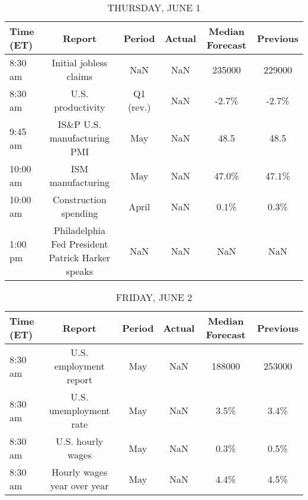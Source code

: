 \documentclass{article}%
\begin{document}
%


\begin{table}[htbp]%
\caption{THURSDAY, JUNE 1}%
\centering%
\begin{adjustbox}{width=1\textwidth}%
\begin{tabular}{lccccc}
\toprule
Time (ET) &                                           Report &    Period & Actual & Median Forecast & Previous \\
\midrule
  8:30 am &                           Initial jobless claims &       NaN &    NaN &          235000 &   229000 \\
  8:30 am &                                U.S. productivity & Q1 (rev.) &    NaN &           -2.7\% &    -2.7\% \\
  9:45 am &                      IS\&P U.S. manufacturing PMI &       May &    NaN &            48.5 &     48.5 \\
 10:00 am &                                ISM manufacturing &       May &    NaN &           47.0\% &    47.1\% \\
 10:00 am &                            Construction spending &     April &    NaN &            0.1\% &     0.3\% \\
  1:00 pm & Philadelphia Fed President Patrick Harker speaks &       NaN &    NaN &             NaN &      NaN \\
\bottomrule
\end{tabular}
%
\end{adjustbox}%
\end{table}

%


\begin{table}[htbp]%
\caption{FRIDAY, JUNE 2}%
\centering%
\begin{adjustbox}{width=1\textwidth}%
\begin{tabular}{lccccc}
\toprule
Time (ET) &                      Report & Period & Actual & Median Forecast & Previous \\
\midrule
  8:30 am &      U.S. employment report &    May &    NaN &          188000 &   253000 \\
  8:30 am &      U.S. unemployment rate &    May &    NaN &            3.5\% &     3.4\% \\
  8:30 am &           U.S. hourly wages &    May &    NaN &            0.3\% &     0.5\% \\
  8:30 am & Hourly wages year over year &    May &    NaN &            4.4\% &     4.5\% \\
\bottomrule
\end{tabular}
%
\end{adjustbox}%
\end{table}
\end{document}
